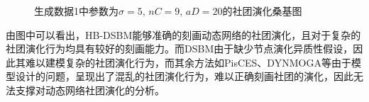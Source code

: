 \begin{figure}[!htbp]
{	}
	\caption{生成数据1中参数为$\sigma = 5$, $nC = 9$, $aD = 20$的社团演化桑基图}
	\label{fig:SankeyFacetnet}
	\vspace{-0.5cm}
\end{figure}

由图中可以看出，HB-DSBM能够准确的刻画动态网络的社团演化，且对于复杂的社团演化行为均具有较好的刻画能力。而DSBM由于缺少节点演化异质性假设，因此其难以建模复杂的社团演化行为，而其余方法如PisCES、DYNMOGA等由于模型设计的问题，呈现出了混乱的社团演化行为，难以正确刻画社团的演化，因此无法支撑对动态网络社团演化的分析。







